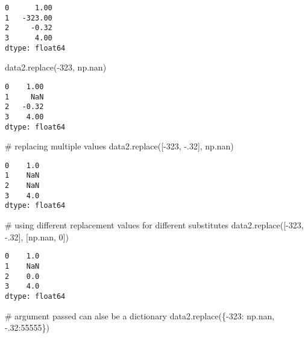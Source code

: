 \documentclass[
  letterpaper,
  DIV=11,
  numbers=noendperiod]{scrreprt}
\newenvironment{Shaded}{\begin{snugshade}}{\end{snugshade}}
\newcommand{\CommentTok}[1]{\textcolor[rgb]{0.37,0.37,0.37}{#1}}
\newcommand{\DecValTok}[1]{\textcolor[rgb]{0.68,0.00,0.00}{#1}}
\newcommand{\FloatTok}[1]{\textcolor[rgb]{0.68,0.00,0.00}{#1}}
\newcommand{\NormalTok}[1]{\textcolor[rgb]{0.00,0.23,0.31}{#1}}
\newcommand{\OperatorTok}[1]{\textcolor[rgb]{0.37,0.37,0.37}{#1}}
\begin{document}
\begin{verbatim}
0      1.00
1   -323.00
2     -0.32
3      4.00
dtype: float64
\end{verbatim}

\begin{Shaded}
\begin{Highlighting}[]
\NormalTok{data2.replace(}\OperatorTok{{-}}\DecValTok{323}\NormalTok{, np.nan)}
\end{Highlighting}
\end{Shaded}

\begin{verbatim}
0    1.00
1     NaN
2   -0.32
3    4.00
dtype: float64
\end{verbatim}

\begin{Shaded}
\begin{Highlighting}[]
\CommentTok{\# replacing multiple values}
\NormalTok{data2.replace([}\OperatorTok{{-}}\DecValTok{323}\NormalTok{, }\OperatorTok{{-}}\FloatTok{.32}\NormalTok{], np.nan)}
\end{Highlighting}
\end{Shaded}

\begin{verbatim}
0    1.0
1    NaN
2    NaN
3    4.0
dtype: float64
\end{verbatim}

\begin{Shaded}
\begin{Highlighting}[]
\CommentTok{\# using different replacement values for different substitutes}
\NormalTok{data2.replace([}\OperatorTok{{-}}\DecValTok{323}\NormalTok{, }\OperatorTok{{-}}\FloatTok{.32}\NormalTok{], [np.nan, }\DecValTok{0}\NormalTok{])}
\end{Highlighting}
\end{Shaded}

\begin{verbatim}
0    1.0
1    NaN
2    0.0
3    4.0
dtype: float64
\end{verbatim}

\begin{Shaded}
\begin{Highlighting}[]
\CommentTok{\# argument passed can alse be a dictionary}
\NormalTok{data2.replace(\{}\OperatorTok{{-}}\DecValTok{323}\NormalTok{: np.nan, }\OperatorTok{{-}}\FloatTok{.32}\NormalTok{:}\DecValTok{55555}\NormalTok{\})}
\end{Highlighting}
\end{Shaded}
\end{document}
